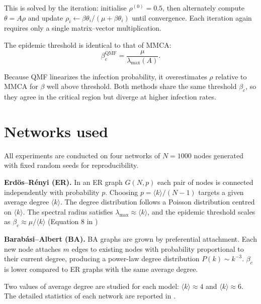 \documentclass{article}
\begin{document}
This is solved by the iteration: initialise $\rho^{(0)} = 0.5$, then alternately compute $\theta = A\rho$ and update $\rho_i \leftarrow \beta\theta_i / (\mu + \beta\theta_i)$ until convergence. Each iteration again requires only a single matrix--vector multiplication.

The epidemic threshold is identical to that of MMCA:
\begin{equation}
    \beta_c^{\text{QMF}} = \frac{\mu}{\lambda_{\max}(A)}.
\end{equation}

Because QMF linearizes the infection probability, it overestimates $\rho$ relative to MMCA for $\beta$ well above threshold. Both methods share the same threshold $\beta_c$, so they agree in the critical region but diverge at higher infection rates.

\section{Networks used}
All experiments are conducted on four networks of $N = 1000$ nodes generated with fixed random seeds for reproducibility.

\textbf{Erdös--Rényi (ER).} In an ER graph $G(N,p)$ each pair of nodes is connected independently with probability $p$. Choosing $p = \langle k \rangle / (N-1)$ targets a given average degree $\langle k \rangle$. The degree distribution follows a Poisson distribution centred on $\langle k \rangle$. The spectral radius satisfies $\lambda_{\max} \approx \langle k \rangle$, and the epidemic threshold scales as $\beta_c \approx \mu / \langle k \rangle$ (Equation 8 in \cite{gomez2010discrete})


\textbf{Barabási--Albert (BA).} BA graphs are grown by preferential attachment. Each new node attaches $m$ edges to existing nodes with probability proportional to their current degree, producing a power-law degree distribution $P(k) \sim k^{-3}$. $\beta_c$ is lower compared to ER graphs with the same average degree.

Two values of average degree are studied for each model: $\langle k \rangle \approx 4$ and $\langle k \rangle \approx 6$. The detailed statistics of each network are reported in .
\end{document}

